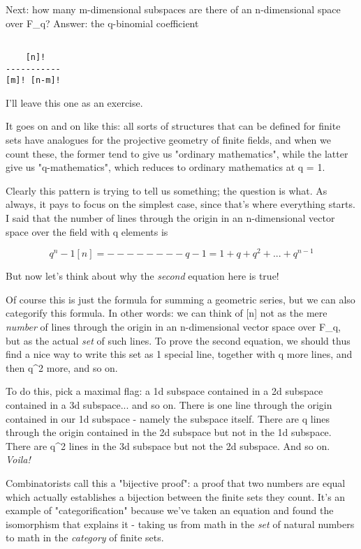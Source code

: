 Next: how many m-dimensional subspaces are there of an n-dimensional
space over F_{q}?  Answer: the q-binomial coefficient


\begin{verbatim}

    [n]! 
-----------
[m]! [n-m]!
\end{verbatim}
    
I'll leave this one as an exercise.

It goes on and on like this: all sorts of structures that can
be defined for finite sets have analogues for the projective
geometry of finite fields, and when we count these, the former
tend to give us "ordinary mathematics", while the latter give
us "q-mathematics", which reduces to ordinary mathematics at q = 1.

Clearly this pattern is trying to tell us something; the question 
is what.  As always, it pays to focus on the simplest case, since
that's where everything starts.  I said that the number of lines
through the origin in an n-dimensional vector space over the field
with q elements is


$$

           q^{n} - 1
  [n]  =   --------   
            q - 1

       = 1 + q + q^{2} + ... + q^{n-1}
$$
    
But now let's think about why the \emph{second} equation here is true!  


Of course this is just the formula for summing a geometric series, but
we can also categorify this formula.  In other words: we can think of
[n] not as the mere \emph{number} of lines through the origin in an
n-dimensional vector space over F_{q}, but as the actual
\emph{set} of such lines.  To prove the second equation, we should
thus find a nice way to write this set as 1 special line, together with
q more lines, and then q^{2} more, and so on.

To do this, pick a maximal flag: a 1d subspace contained in a 2d
subspace contained in a 3d subspace... and so on.   There is one line
through the origin contained in our 1d subspace - namely the subspace
itself.   There are q lines through the origin contained in the 2d
subspace but not in the 1d subspace.  There are q^{2} lines in the 3d
subspace but not the 2d subspace.  And so on.  \emph{Voila!}

Combinatorists call this a "bijective proof": a proof that two
numbers are equal which actually establishes a bijection between the
finite sets they count.  It's an example of "categorification"
because we've taken an equation and found the isomorphism that explains
it - taking us from math in the \emph{set} of natural numbers to math in the
\emph{category} of finite sets.

